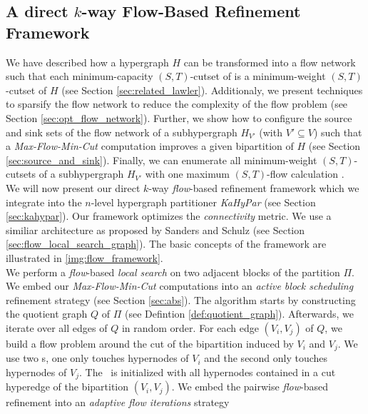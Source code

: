 \subsection{A direct $k$-way Flow-Based Refinement Framework}
\label{sec:flow_local_search_hypergraph}

We have described how a hypergraph $H$ can be transformed into
a flow network  such that each minimum-capacity $(S,T)$-cutset of  is a 
minimum-weight  $(S,T)$-cutset of $H$ (see Section \ref{sec:related_lawler}). 
Additionaly, we present techniques to sparsify the
flow network  \cite{lawler1973} to reduce the complexity of 
the flow problem (see Section \ref{sec:opt_flow_network}). 
Further, we show how to configure the source and sink sets of the flow network of a 
subhypergraph $H_{V'}$ (with $V' \subseteq V$) such that a \emph{Max-Flow-Min-Cut} 
computation improves a given bipartition of $H$ (see Section \ref{sec:source_and_sink}). 
Finally, we can enumerate all minimum-weight $(S,T)$-cutsets of a subhypergraph 
$H_{V'}$ with one maximum $(S,T)$-flow calculation \cite{picard1980structure}. \\
We will now present our direct $k$-way \emph{flow}-based refinement framework which we integrate
into the $n$-level hypergraph partitioner \emph{KaHyPar} \cite{heuer2017improving} 
(see Section \ref{sec:kahypar}). Our framework optimizes
the \emph{connectivity} metric. We use a similiar architecture as proposed
by Sanders and Schulz \cite{sanders2011engineering} (see Section 
\ref{sec:flow_local_search_graph}). The basic concepts of the framework are
illustrated in \autoref{img:flow_framework}. \\
We perform a \emph{flow}-based \emph{local search} on two adjacent blocks of
the partition $\Pi$. We embed our \emph{Max-Flow-Min-Cut} computations into an \emph{active block scheduling}
refinement strategy \cite{holtgrewe2010engineering} (see Section \ref{sec:abs}).
The algorithm starts by constructing the quotient graph $Q$ of $\Pi$ (see Defintion \ref{def:quotient_graph}). 
Afterwards, we iterate over all edges of $Q$ in random order. For each edge
$(V_i,V_j)$ of $Q$, we build a flow problem around the cut of the bipartition
induced by $V_i$ and $V_j$. We use two \BFS s, one only 
touches hypernodes of $V_i$ and the second only touches hypernodes of $V_j$.
The \BFS~is initialized with all hypernodes contained in a cut hyperedge
of the bipartition $(V_i,V_j)$. We embed the pairwise \emph{flow}-based refinement
into an \emph{adaptive flow iterations} strategy \cite{sanders2011engineering}

